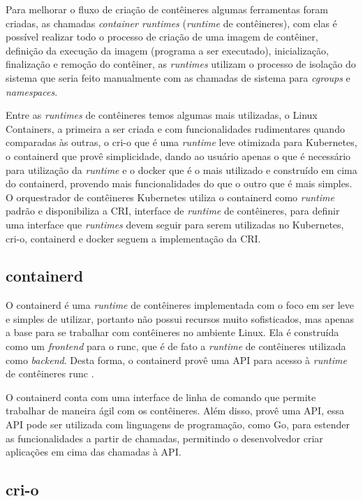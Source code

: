 Para melhorar o fluxo de criação de contêineres algumas ferramentas foram criadas,
as chamadas \textit{container runtimes} (\textit{runtime} de contêineres), com elas
é possível realizar todo o processo de criação de uma imagem de contêiner, definição
da execução da imagem (programa a ser executado), inicialização, finalização e
remoção do contêiner, as \textit{runtimes} utilizam o processo de isolação do sistema
que seria feito manualmente com as chamadas de sistema para \textit{cgroups} e
\textit{namespaces}.

Entre as \textit{runtimes} de contêineres temos algumas mais utilizadas, o Linux Containers,
a primeira a ser criada e com funcionalidades rudimentares quando comparadas às outras, o
cri-o que é uma \textit{runtime} leve otimizada para Kubernetes, o
containerd que provê simplicidade, dando ao usuário apenas o que é necessário
para utilização da \textit{runtime} e o docker que é o mais utilizado e construído
em cima do containerd, provendo mais funcionalidades do que o outro que é mais simples.
O orquestrador de contêineres Kubernetes utiliza o containerd como \textit{runtime}
padrão e disponibiliza a CRI, interface de \textit{runtime} de contêineres, para
definir uma interface que \textit{runtimes} devem seguir para serem utilizadas
no Kubernetes, cri-o, containerd e docker seguem a implementação da CRI.

\subsection{containerd}

O containerd é uma \textit{runtime} de contêineres implementada com o foco em
ser leve e simples de utilizar, portanto não possui recursos muito sofisticados,
mas apenas a base para se trabalhar com contêineres no ambiente Linux. Ela é
construída como um \textit{frontend} para o runc, que é de fato a \textit{runtime}
de contêineres utilizada como \textit{backend}. Desta forma, o containerd provê
uma API para acesso à \textit{runtime} de contêineres runc \cite{containerd}.

O containerd conta com uma interface de linha de comando que permite trabalhar
de maneira ágil com os contêineres. Além disso, provê uma API, essa API pode ser
utilizada com linguagens de programação, como Go, para estender as funcionalidades
a partir de chamadas, permitindo o desenvolvedor criar aplicações em cima das
chamadas à API.

\subsection{cri-o}

